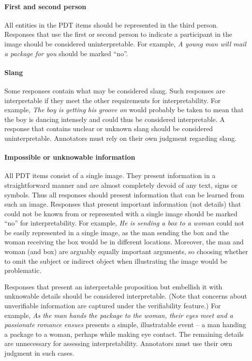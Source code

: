 \documentclass[12pt,notitlepage]{article}
\begin{document}
\paragraph{First and second person} All entities in the PDT items should be represented in the third person. Responses that use the first or second person to indicate a participant in the image should be considered uninterpretable. For example, \textit{A young man will mail a package for you} should be marked ``no''. 

\paragraph{Slang} Some responses contain what may be considered slang. Such responses are interpretable if they meet the other requirements for interpretability. For example, \textit{The boy is getting his groove on} would probably be taken to mean that the boy is dancing intensely and could thus be considered interpretable. A response that contains unclear or unknown slang should be considered uninterpretable. Annotators must rely on their own judgment regarding slang.

\paragraph{Impossible or unknowable information} All PDT items consist of a single image. They present information in a straightforward manner and are almost completely devoid of any text, signs or symbols. Thus all responses should present information that can be learned from such an image. Responses that present important information (not details) that could not be known from or represented with a single image should be marked ``no'' for interpretability. For example, \textit{He is sending a box to a woman} could not be easily represented in a single image, as the man sending the box and the woman receiving the box would be in different locations. Moreover, the man and woman (and box) are arguably equally important arguments, so choosing whether to omit the subject or indirect object when illustrating the image would be problematic.

Responses that present an interpretable proposition but embellish it with unknowable details should be considered interpretable. (Note that concerns about unverifiable information are captured under the verifiability feature.) For example, \textit{As the man hands the package to the woman, their eyes meet and a passionate romance ensues} presents a simple, illustratable event -- a man handing a package to a woman, perhaps while making eye contact. The remaining details are unnecessary for assessing interpretability. Annotators must use their own judgment in such cases.
\end{document}

